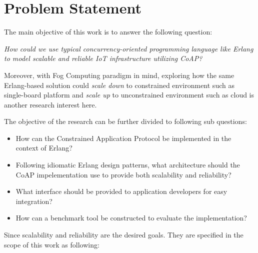 \chapter{Problem Statement}\label{ch2}



The main objective of this work is to answer the following question:

\textit{How could we use typical concurrency-oriented programming language like Erlang to model scalable and reliable IoT infrastructure utilizing CoAP?}

Moreover, with Fog Computing paradigm in mind, exploring how the same Erlang-based solution could \textit{scale down} to constrained environment such as single-board platform and \textit{scale up} to unconstrained environment such as cloud is another research interest here.

The objective of the research can be further divided to following sub questions:

\begin{itemize}

\item How can the Constrained Application Protocol be implemented in the context of Erlang? 
\item Following idiomatic Erlang design patterns, what architecture should the CoAP impelementation use to provide both scalability and reliability? 
\item What interface should be provided to application developers for easy integration? 
\item How can a benchmark tool be constructed to evaluate the implementation? 

\end{itemize}

Since scalability and reliability are the desired goals. They are specified in the scope of this work as following:

